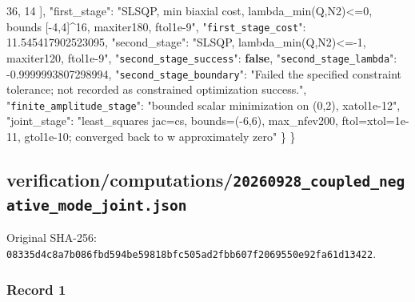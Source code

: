\documentclass[
  10pt,
]{article}
\newenvironment{Shaded}{}{}
\newcommand{\DataTypeTok}[1]{\textcolor[rgb]{0.56,0.13,0.00}{#1}}
\newcommand{\DecValTok}[1]{\textcolor[rgb]{0.25,0.63,0.44}{#1}}
\newcommand{\FloatTok}[1]{\textcolor[rgb]{0.25,0.63,0.44}{#1}}
\newcommand{\FunctionTok}[1]{\textcolor[rgb]{0.02,0.16,0.49}{#1}}
\newcommand{\KeywordTok}[1]{\textcolor[rgb]{0.00,0.44,0.13}{\textbf{#1}}}
\newcommand{\OtherTok}[1]{\textcolor[rgb]{0.00,0.44,0.13}{#1}}
\newcommand{\StringTok}[1]{\textcolor[rgb]{0.25,0.44,0.63}{#1}}
\begin{document}
\begin{Shaded}
\begin{Highlighting}[]
      \DecValTok{36}\OtherTok{,}
      \DecValTok{14}
    \OtherTok{]}\FunctionTok{,}
    \DataTypeTok{"first\_stage"}\FunctionTok{:} \StringTok{"SLSQP, min biaxial cost, lambda\_min(Q,N2)\textless{}=0, bounds [{-}4,4]\^{}16, maxiter180, ftol1e{-}9"}\FunctionTok{,}
    \DataTypeTok{"\nolinkurl{first_stage_cost}"}\FunctionTok{:} \FloatTok{11.545417902523095}\FunctionTok{,}
    \DataTypeTok{"second\_stage"}\FunctionTok{:} \StringTok{"SLSQP, lambda\_min(Q,N2)\textless{}={-}1, maxiter120, ftol1e{-}9"}\FunctionTok{,}
    \DataTypeTok{"\nolinkurl{second_stage_success}"}\FunctionTok{:} \KeywordTok{false}\FunctionTok{,}
    \DataTypeTok{"\nolinkurl{second_stage_lambda}"}\FunctionTok{:} \FloatTok{{-}0.9999993807298994}\FunctionTok{,}
    \DataTypeTok{"\nolinkurl{second_stage_boundary}"}\FunctionTok{:} \StringTok{"Failed the specified constraint tolerance; not recorded as constrained optimization success."}\FunctionTok{,}
    \DataTypeTok{"\nolinkurl{finite_amplitude_stage}"}\FunctionTok{:} \StringTok{"bounded scalar minimization on (0,2), xatol1e{-}12"}\FunctionTok{,}
    \DataTypeTok{"joint\_stage"}\FunctionTok{:} \StringTok{"least\_squares jac=cs, bounds=({-}6,6), max\_nfev200, ftol=xtol=1e{-}11, gtol1e{-}10; converged back to w approximately zero"}
  \FunctionTok{\}}
\FunctionTok{\}}
\end{Highlighting}
\end{Shaded}

\hypertarget{verificationcomputations20260928_coupled_negative_mode_joint.json}{%
\subsection{verification/computations/\nolinkurl{20260928_coupled_negative_mode_joint.json}}\label{verificationcomputations20260928_coupled_negative_mode_joint.json}}

Original SHA-256:
\nolinkurl{08335d4c8a7b086fbd594be59818bfc505ad2fbb607f2069550e92fa61d13422}.

\hypertarget{record-1-5}{%
\subsubsection{Record 1}\label{record-1-5}}
\end{document}
